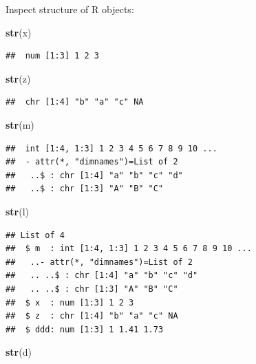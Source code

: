 \documentclass[12pt,]{book}
\newenvironment{Shaded}{\begin{snugshade}}{\end{snugshade}}
\newcommand{\KeywordTok}[1]{\textcolor[rgb]{0.13,0.29,0.53}{\textbf{#1}}}
\newcommand{\NormalTok}[1]{#1}
\begin{document}
Inspect structure of R objects:

\begin{Shaded}
\begin{Highlighting}[]
\KeywordTok{str}\NormalTok{(x)}
\end{Highlighting}
\end{Shaded}

\begin{verbatim}
##  num [1:3] 1 2 3
\end{verbatim}

\begin{Shaded}
\begin{Highlighting}[]
\KeywordTok{str}\NormalTok{(z)}
\end{Highlighting}
\end{Shaded}

\begin{verbatim}
##  chr [1:4] "b" "a" "c" NA
\end{verbatim}

\begin{Shaded}
\begin{Highlighting}[]
\KeywordTok{str}\NormalTok{(m)}
\end{Highlighting}
\end{Shaded}

\begin{verbatim}
##  int [1:4, 1:3] 1 2 3 4 5 6 7 8 9 10 ...
##  - attr(*, "dimnames")=List of 2
##   ..$ : chr [1:4] "a" "b" "c" "d"
##   ..$ : chr [1:3] "A" "B" "C"
\end{verbatim}

\begin{Shaded}
\begin{Highlighting}[]
\KeywordTok{str}\NormalTok{(l)}
\end{Highlighting}
\end{Shaded}

\begin{verbatim}
## List of 4
##  $ m  : int [1:4, 1:3] 1 2 3 4 5 6 7 8 9 10 ...
##   ..- attr(*, "dimnames")=List of 2
##   .. ..$ : chr [1:4] "a" "b" "c" "d"
##   .. ..$ : chr [1:3] "A" "B" "C"
##  $ x  : num [1:3] 1 2 3
##  $ z  : chr [1:4] "b" "a" "c" NA
##  $ ddd: num [1:3] 1 1.41 1.73
\end{verbatim}

\begin{Shaded}
\begin{Highlighting}[]
\KeywordTok{str}\NormalTok{(d)}
\end{Highlighting}
\end{Shaded}
\end{document}
